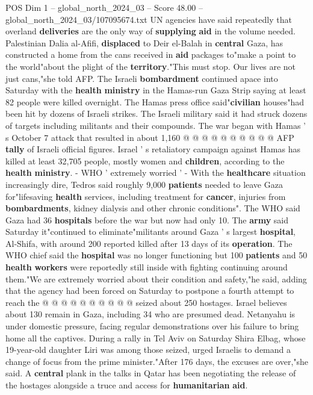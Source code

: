\begin{textsample}{POS Dim 1 – global\_north\_2024\_03 – Score 48.00 – global\_north\_2024\_03/107095674.txt}
UN agencies have said repeatedly that overland \textbf{deliveries} are the only way of \textbf{supplying} \textbf{aid} in the volume needed.
Palestinian Dalia al-Afifi, \textbf{displaced} to Deir el-Balah in \textbf{central} Gaza, has constructed a home from the cans received in \textbf{aid} packages to"make a point to the world"about the plight of the \textbf{territory}."This must stop.
Our lives are not just cans,"she told AFP.
The Israeli \textbf{bombardment} continued apace into Saturday with the \textbf{health} \textbf{ministry} in the Hamas-run Gaza Strip saying at least 82 people were killed overnight.
The Hamas press office said"\textbf{civilian} houses"had been hit by dozens of Israeli strikes.
The Israeli military said it had struck dozens of targets including militants and their compounds.
The war began with Hamas ' s October 7 attack that resulted in about 1,160 @ @ @ @ @ @ @ @ @ @ AFP \textbf{tally} of Israeli official figures.
Israel ' s retaliatory campaign against Hamas has killed at least 32,705 people, mostly women and \textbf{children}, according to the \textbf{health} \textbf{ministry}. - WHO ' extremely worried ' - With the \textbf{healthcare} situation increasingly dire, Tedros said roughly 9,000 \textbf{patients} needed to leave Gaza for"lifesaving \textbf{health} services, including treatment for \textbf{cancer}, injuries from \textbf{bombardments}, kidney dialysis and other chronic conditions".
The WHO said Gaza had 36 \textbf{hospitals} before the war but now had only 10.
The \textbf{army} said Saturday it"continued to eliminate"militants around Gaza ' s largest \textbf{hospital}, Al-Shifa, with around 200 reported killed after 13 days of its \textbf{operation}.
The WHO chief said the \textbf{hospital} was no longer functioning but 100 \textbf{patients} and 50 \textbf{health} \textbf{workers} were reportedly still inside with fighting continuing around them."We are extremely worried about their condition and safety,"he said, adding that the agency had been forced on Saturday to postpone a fourth attempt to reach the @ @ @ @ @ @ @ @ @ @ seized about 250 hostages.
Israel believes about 130 remain in Gaza, including 34 who are presumed dead.
Netanyahu is under domestic pressure, facing regular demonstrations over his failure to bring home all the captives.
During a rally in Tel Aviv on Saturday Shira Elbag, whose 19-year-old daughter Liri was among those seized, urged Israelis to demand a change of focus from the prime minister."After 176 days, the excuses are over,"she said.
A \textbf{central} plank in the talks in Qatar has been negotiating the release of the hostages alongside a truce and access for \textbf{humanitarian} \textbf{aid}.

\end{textsample}
